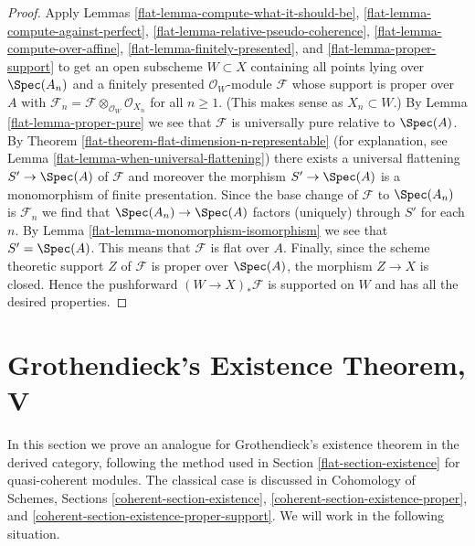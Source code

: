 \begin{proof}

Apply Lemmas \ref{flat-lemma-compute-what-it-should-be},
\ref{flat-lemma-compute-against-perfect},
\ref{flat-lemma-relative-pseudo-coherence},
\ref{flat-lemma-compute-over-affine},
\ref{flat-lemma-finitely-presented}, and
\ref{flat-lemma-proper-support}
to get an open subscheme $W \subset X$ containing all points
lying over $\Spec(A_n)$
and a finitely presented $\mathcal{O}_W$-module $\mathcal{F}$
whose support is proper over $A$ with
$\mathcal{F}_n = \mathcal{F} \otimes_{\mathcal{O}_W} \mathcal{O}_{X_n}$
for all $n \geq 1$. (This makes sense as $X_n \subset W$.)
By Lemma \ref{flat-lemma-proper-pure} we see that $\mathcal{F}$
is universally pure relative to $\Spec(A)$.
By Theorem \ref{flat-theorem-flat-dimension-n-representable}
(for explanation, see Lemma \ref{flat-lemma-when-universal-flattening})
there exists a universal flattening $S' \to \Spec(A)$
of $\mathcal{F}$ and moreover the morphism $S' \to \Spec(A)$
is a monomorphism of finite presentation.
Since the base change of $\mathcal{F}$ to $\Spec(A_n)$
is $\mathcal{F}_n$ we find that $\Spec(A_n) \to \Spec(A)$
factors (uniquely) through $S'$ for each $n$.
By Lemma \ref{flat-lemma-monomorphism-isomorphism}
we see that $S' = \Spec(A)$.
This means that $\mathcal{F}$ is flat over $A$.
Finally, since the scheme theoretic support $Z$ of $\mathcal{F}$
is proper over $\Spec(A)$, the morphism $Z \to X$ is closed.
Hence the pushforward $(W \to X)_*\mathcal{F}$ is supported
on $W$ and has all the desired properties.
\end{proof}

\section{Grothendieck's Existence Theorem, V}
\label{flat-section-existence-derived}
In this section we prove an analogue for Grothendieck's existence theorem
in the derived category, following the method used in
Section \ref{flat-section-existence} for quasi-coherent modules.
The classical case is discussed in
Cohomology of Schemes, Sections \ref{coherent-section-existence},
\ref{coherent-section-existence-proper}, and
\ref{coherent-section-existence-proper-support}.
We will work in the following situation.

